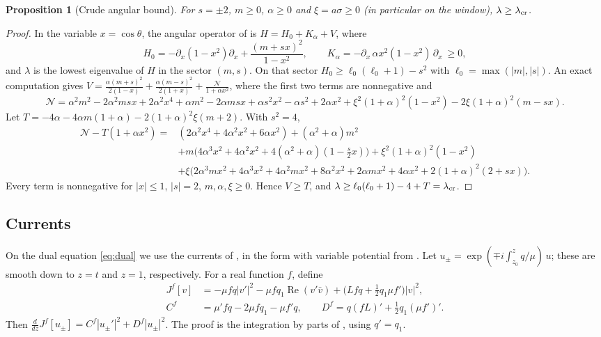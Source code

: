 \documentclass[11pt]{amsart}
\newtheorem{proposition}[theorem]{Proposition}
\theoremstyle{definition}
\theoremstyle{remark}
\numberwithin{equation}{section}
\renewcommand{\Re}{\operatorname{Re}}
\begin{document}
\begin{proposition}[Crude angular bound]\label{prop:angular}
For $s=\pm2$, $m\ge0$, $\alpha\ge0$ and $\xi=a\sigma\ge0$ (in particular on the window), $\lambda\ge\lambda_{\rm cr}$.
\end{proposition}
\begin{proof}
In the variable $x=\cos\theta$, the angular operator of \cite[(2.3)]{STU98} is $H=H_0+K_\alpha+V$, where
\[
H_0=-\partial_x(1-x^2)\partial_x+\frac{(m+sx)^2}{1-x^2},\qquad K_\alpha=-\partial_x\,\alpha x^2(1-x^2)\,\partial_x\ \ge0,
\]
and $\lambda$ is the lowest eigenvalue of $H$ in the sector $(m,s)$. On that sector $H_0\ge\ell_0(\ell_0+1)-s^2$ with
$\ell_0=\max(|m|,|s|)$. An exact computation gives
$V=\frac{\alpha(m+s)^2}{2(1-x)}+\frac{\alpha(m-s)^2}{2(1+x)}+\frac{\mathcal N}{1+\alpha x^2}$, where the first two terms are
nonnegative and
\[
\mathcal N=\alpha^2m^2-2\alpha^2msx+2\alpha^2x^4+\alpha m^2-2\alpha msx+\alpha s^2x^2-\alpha s^2+2\alpha x^2
+\xi^2(1+\alpha)^2(1-x^2)-2\xi(1+\alpha)^2(m-sx).
\]
Let $T=-4\alpha-4\alpha m(1+\alpha)-2(1+\alpha)^2\xi(m+2)$. With $s^2=4$,
\begin{align*}
\mathcal N-T(1+\alpha x^2)={}&(2\alpha^2x^4+4\alpha^2x^2+6\alpha x^2)+(\alpha^2+\alpha)m^2\\
&+m\big(4\alpha^3x^2+4\alpha^2x^2+4(\alpha^2+\alpha)(1-\tfrac{s}{2}x)\big)+\xi^2(1+\alpha)^2(1-x^2)\\
&+\xi\big(2\alpha^3mx^2+4\alpha^3x^2+4\alpha^2mx^2+8\alpha^2x^2+2\alpha mx^2+4\alpha x^2
+2(1+\alpha)^2(2+sx)\big).
\end{align*}
Every term is nonnegative for $|x|\le1$, $|s|=2$, $m,\alpha,\xi\ge0$. Hence $V\ge T$, and
$\lambda\ge\ell_0(\ell_0+1)-4+T=\lambda_{\rm cr}$.
\end{proof}


\subsection{Currents}
On the dual equation \eqref{eq:dual} we use the currents of \cite[Lemma~4.1]{Hin26}, in the form with variable
potential from \cite[\S7]{Hin26}. Let $u_\pm=\exp(\mp i\int_{z_0}^zq/\mu)\,u$; these are smooth down to $z=t$ and
$z=1$, respectively. For a real function $f$, define
\begin{align*}
J^f[v]&=-\mu fq|v'|^2-\mu fq_1\Re(v'\bar v)+\big(Lfq+\tfrac12q_1\mu f'\big)|v|^2,\\
C^f&=\mu'fq-2\mu fq_1-\mu f'q,\qquad D^f=q(fL)'+\tfrac12q_1(\mu f')'.
\end{align*}
Then $\frac{d}{dz}J^f[u_\pm]=C^f|u_\pm'|^2+D^f|u_\pm|^2$. The proof is the integration by parts of
\cite[Lemma~4.1]{Hin26}, using $q'=q_1$.
\end{document}
